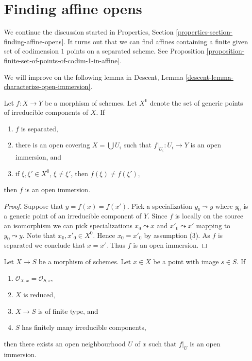 \section{Finding affine opens}
\label{section-finding-affine-opens}

\noindent
We continue the discussion started in
Properties, Section \ref{properties-section-finding-affine-opens}.
It turns out that we can find affines containing a finite given set
of codimension $1$ points on a separated scheme. See
Proposition \ref{proposition-finite-set-of-points-of-codim-1-in-affine}.

\medskip\noindent
We will improve on the following lemma in
Descent, Lemma \ref{descent-lemma-characterize-open-immersion}.

\begin{lemma}
\label{lemma-characterize-open-immersion}
Let $f : X \to Y$ be a morphism of schemes. Let $X^0$ denote the set
of generic points of irreducible components of $X$. If
\begin{enumerate}
\item $f$ is separated,
\item there is an open covering $X = \bigcup U_i$ such that
$f|_{U_i} : U_i \to Y$ is an open immersion, and
\item if $\xi, \xi' \in X^0$, $\xi \not = \xi'$, then $f(\xi) \not = f(\xi')$,
\end{enumerate}
then $f$ is an open immersion.
\end{lemma}

\begin{proof}
Suppose that $y = f(x) = f(x')$. Pick a specialization $y_0 \leadsto y$
where $y_0$ is a generic point of an irreducible component of $Y$.
Since $f$ is locally on the source an isomorphism we can pick specializations
$x_0 \leadsto x$ and $x'_0 \leadsto x'$ mapping to $y_0 \leadsto y$.
Note that $x_0, x'_0 \in X^0$. Hence $x_0 = x'_0$ by assumption (3).
As $f$ is separated we conclude that $x = x'$. Thus $f$ is an open immersion.
\end{proof}

\begin{lemma}
\label{lemma-local-isomorphism}
Let $X \to S$ be a morphism of schemes. Let $x \in X$ be a point with
image $s \in S$. If
\begin{enumerate}
\item $\mathcal{O}_{X, x} = \mathcal{O}_{S, s}$,
\item $X$ is reduced,
\item $X \to S$ is of finite type, and
\item $S$ has finitely many irreducible components,
\end{enumerate}
then there exists an open neighbourhood $U$
of $x$ such that $f|_U$ is an open immersion.
\end{lemma}

